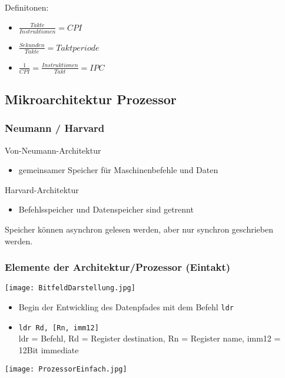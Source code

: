 		Definitonen:
		\begin{itemize}
			\item $\frac{Takte}{Instruktionen} = CPI$
			\item $\frac{Sekunden}{Takte} = Taktperiode$
			\item $\frac{1}{CPI} = \frac{Instruktionen}{Takt} = IPC$ 
		\end{itemize}

		\vspace{0.8cm}
	\subsection{Mikroarchitektur Prozessor}
		\subsubsection{Neumann / Harvard}
			Von-Neumann-Architektur
			\begin{itemize}
				\item gemeinsamer Speicher für Maschinenbefehle und Daten
			\end{itemize}

			Harvard-Architektur
			\begin{itemize}
				\item Befehlsspeicher und Datenspeicher sind getrennt
			\end{itemize}

			Speicher können asynchron gelesen werden, aber nur synchron geschrieben werden.


		\subsubsection{Elemente der Architektur/Prozessor (Eintakt)}
			\centerline{\texttt{[image: BitfeldDarstellung.jpg]}}
			\begin{itemize}
				\item Begin der Entwickling des Datenpfades mit dem Befehl \texttt{ldr}
				\item \texttt{ldr Rd, [Rn, imm12]} \\
					ldr = Befehl, Rd = Register destination, Rn = Register name, imm12 = 12Bit immediate
			\end{itemize}
			

			\begin{center}
				\texttt{[image: ProzessorEinfach.jpg]}
			\end{center}

